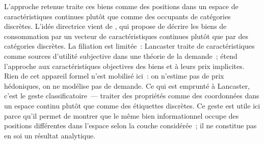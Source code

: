L'approche retenue traite ces biens comme des positions dans un espace de caractéristiques continues plutôt que comme des occupants de catégories discrètes. L'idée directrice vient de \textcite{lancaster_new_1966}, qui propose de décrire les biens de consommation par un vecteur de caractéristiques continues plutôt que par des catégories discrètes. La filiation est limitée~: Lancaster traite de caractéristiques comme sources d'utilité subjective dans une théorie de la demande~; \textcite{rosen_hedonic_1974} étend l'approche aux caractéristiques objectives des biens et à leurs prix implicites. Rien de cet appareil formel n'est mobilisé ici~: on n'estime pas de prix hédoniques, on ne modélise pas de demande. Ce qui est emprunté à Lancaster, c'est le geste classificatoire~--- traiter des propriétés comme des coordonnées dans un espace continu plutôt que comme des étiquettes discrètes. Ce geste est utile ici parce qu'il permet de montrer que le même bien informationnel occupe des positions différentes dans l'espace selon la couche considérée~; il ne constitue pas en soi un résultat analytique.

